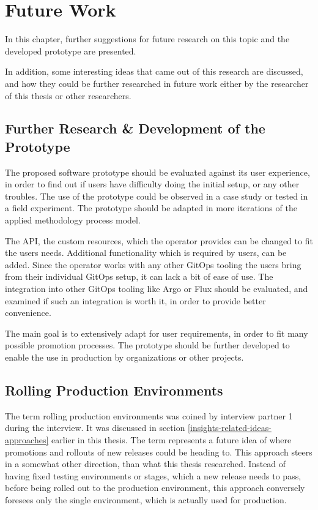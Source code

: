 \chapter{Future Work}
\label{future-work}

In this chapter,
further suggestions for future research on this topic and the developed prototype are presented.

In addition,
some interesting ideas that came out of this research are discussed,
and how they could be further researched in future work either by the researcher of this thesis or other researchers.



\section*{Further Research \& Development of the Prototype}

The proposed software prototype should be evaluated against its user experience,
in order to find out if users have difficulty doing the initial setup,
or any other troubles.
The use of the prototype could be observed in a case study or tested in a field experiment.
The prototype should be adapted in more iterations of the applied methodology process model.

The API, the custom resources, which the operator provides can be changed to fit the users needs.
Additional functionality which is required by users, can be added.
Since the operator works with any other GitOps tooling the users bring from their individual GitOps setup,
it can lack a bit of ease of use. The integration into other GitOps tooling like Argo or Flux
should be evaluated, and examined if such an integration is worth it, in order to provide better convenience.

The main goal is to extensively adapt for user requirements, in order to fit
many possible promotion processes.
The prototype should be further developed to enable the use in production by organizations or other projects.

\section*{Rolling Production Environments}

The term rolling production environments was coined by interview partner 1 during the interview.
It was discussed in section \ref{insights-related-ideas-approaches} earlier in this thesis.
The term represents a future idea of where promotions and rollouts of new releases could be heading to.
This approach steers in a somewhat other direction, than what this thesis researched.
Instead of having fixed testing environments or stages, which a new release needs to pass,
before being rolled out to the production environment,
this approach conversely foresees only the single environment,
which is actually used for production.

